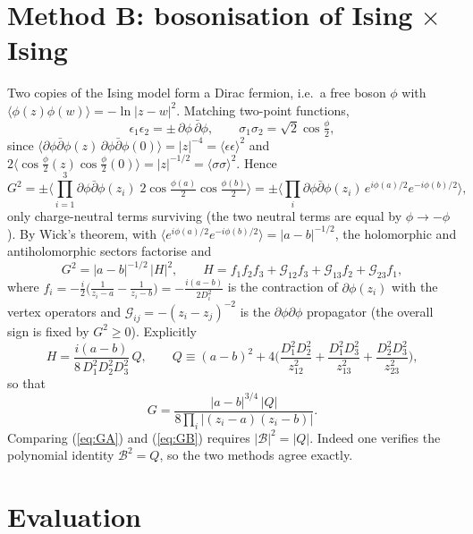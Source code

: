 \documentclass[11pt]{article}
\begin{document}
\section{Method B: bosonisation of Ising$\,\times\,$Ising}
Two copies of the Ising model form a Dirac fermion, i.e.\ a free boson $\phi$ with $\langle\phi(z)\phi(w)\rangle=-\ln|z-w|^2$. Matching two-point functions,
\begin{equation}
\epsilon_1\epsilon_2=\pm\,\partial\phi\,\bar\partial\phi,\qquad \sigma_1\sigma_2=\sqrt2\cos\tfrac{\phi}{2},
\end{equation}
since $\langle\partial\phi\bar\partial\phi(z)\,\partial\phi\bar\partial\phi(0)\rangle=|z|^{-4}=\langle\epsilon\epsilon\rangle^2$ and $2\langle\cos\frac\phi2(z)\cos\frac\phi2(0)\rangle=|z|^{-1/2}=\langle\sigma\sigma\rangle^2$. Hence
\begin{equation}
G^2=\pm\big\langle\textstyle\prod_{i=1}^3\partial\phi\bar\partial\phi(z_i)\;2\cos\tfrac{\phi(a)}2\cos\tfrac{\phi(b)}2\big\rangle
=\pm\big\langle\textstyle\prod_i\partial\phi\bar\partial\phi(z_i)\,e^{i\phi(a)/2}e^{-i\phi(b)/2}\big\rangle ,
\end{equation}
only charge-neutral terms surviving (the two neutral terms are equal by $\phi\to-\phi$). By Wick's theorem, with $\langle e^{i\phi(a)/2}e^{-i\phi(b)/2}\rangle=|a-b|^{-1/2}$, the holomorphic and antiholomorphic sectors factorise and
\begin{equation}
G^2=|a-b|^{-1/2}\,|H|^2,\qquad H=f_1f_2f_3+\mathcal G_{12}f_3+\mathcal G_{13}f_2+\mathcal G_{23}f_1,
\end{equation}
where $f_i=-\frac i2\big(\frac{1}{z_i-a}-\frac{1}{z_i-b}\big)=-\frac{i(a-b)}{2D_i^2}$ is the contraction of $\partial\phi(z_i)$ with the vertex operators and $\mathcal G_{ij}=-(z_i-z_j)^{-2}$ is the $\partial\phi\partial\phi$ propagator (the overall sign is fixed by $G^2\ge0$). Explicitly
\begin{equation}
H=\frac{i(a-b)}{8\,D_1^2D_2^2D_3^2}\,Q,\qquad Q\equiv(a-b)^2+4\Big(\frac{D_1^2D_2^2}{z_{12}^2}+\frac{D_1^2D_3^2}{z_{13}^2}+\frac{D_2^2D_3^2}{z_{23}^2}\Big),
\end{equation}
so that
\begin{equation}
G=\frac{|a-b|^{3/4}\,|Q|}{8\prod_i|(z_i-a)(z_i-b)|}.
\label{eq:GB}
\end{equation}
Comparing (\ref{eq:GA}) and (\ref{eq:GB}) requires $|\mathcal B|^2=|Q|$. Indeed one verifies the polynomial identity $\mathcal B^2=Q$, so the two methods agree exactly. 

\section{Evaluation}
\end{document}
